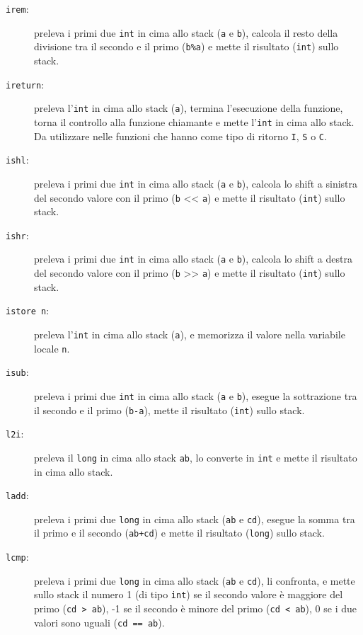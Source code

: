 \begin{description}
  \item[\texttt{irem}:] preleva i primi due \texttt{int} in cima allo stack (\texttt{a} e \texttt{b}), calcola il resto della divisione tra il secondo e il primo (\texttt{b\%a}) e mette il risultato (\texttt{int}) sullo stack.

  \item[\texttt{ireturn}:] preleva l'\texttt{int} in cima allo stack (\texttt{a}), termina l'esecuzione della funzione, torna il controllo alla funzione chiamante e mette l'\texttt{int} in cima allo stack. Da utilizzare nelle funzioni che hanno come tipo di ritorno \texttt{I}, \texttt{S} o \texttt{C}.

  \item[\texttt{ishl}:] preleva i primi due \texttt{int} in cima allo stack (\texttt{a} e \texttt{b}), calcola lo shift a sinistra del secondo valore con il primo (\texttt{b} << \texttt{a}) e mette il risultato (\texttt{int}) sullo stack.

  \item[\texttt{ishr}:] preleva i primi due \texttt{int} in cima allo stack (\texttt{a} e \texttt{b}), calcola lo shift a destra del secondo valore con il primo (\texttt{b} >> \texttt{a}) e mette il risultato (\texttt{int}) sullo stack.

  \item[\texttt{istore n}:] preleva l'\texttt{int} in cima allo stack (\texttt{a}), e memorizza il valore nella variabile locale \texttt{n}.

  \item[\texttt{isub}:] preleva i primi due \texttt{int} in cima allo stack (\texttt{a} e \texttt{b}), esegue la sottrazione tra il secondo e il primo (\texttt{b-a}), mette il risultato (\texttt{int}) sullo stack.

  \item[\texttt{l2i}:] preleva il \texttt{long} in cima allo stack \texttt{ab}, lo converte in \texttt{int} e mette il risultato in cima allo stack.

  \item[\texttt{ladd}:] preleva i primi due \texttt{long} in cima allo stack (\texttt{ab} e \texttt{cd}), esegue la somma tra il primo e il secondo (\texttt{ab+cd}) e mette il risultato (\texttt{long}) sullo stack.

  \item[\texttt{lcmp}:] preleva i primi due \texttt{long} in cima allo stack (\texttt{ab} e \texttt{cd}), li confronta, e mette sullo stack il numero 1 (di tipo \texttt{int}) se il secondo valore \`e maggiore del primo (\texttt{cd > ab}), -1 se il secondo \`e minore del primo (\texttt{cd < ab}), 0 se i due valori sono uguali (\texttt{cd == ab}).


\end{description}
